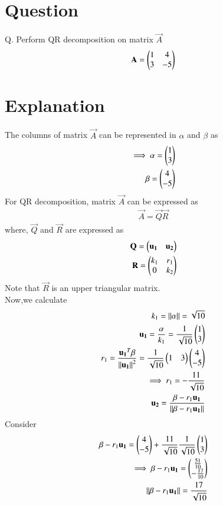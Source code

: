 \documentclass[journal,12pt,twocolumn]{IEEEtran}
\begin{document}
\section{\textbf{Question}}
Q. Perform QR decomposition on matrix $\vec{A}$
\begin{align}
    \mathbf{A}=\begin{pmatrix} 1 & 4 \\ 3 & -5 \end{pmatrix}\label{givmat}
\end{align}
\section{\textbf{Explanation}}
The columns of matrix $\vec{A}$ can be represented in $\alpha$ and $\beta$ as
\begin{align}
    \implies\alpha=\begin{pmatrix}1 \\ 3\end{pmatrix}\\
    \beta=\begin{pmatrix}4 \\ -5\end{pmatrix}
\end{align}
For QR decomposition, matrix $\vec{A}$ can be expressed as
\begin{align}
    \vec{A}=\vec{Q}\vec{R}\label{decomp}
\end{align}
where, $\vec{Q}$ and $\vec{R}$ are expressed as
\begin{align}
    \mathbf{Q}=\begin{pmatrix}\mathbf{u_1} & \mathbf{u_2}\end{pmatrix}\label{Q}\\
    \mathbf{R}=\begin{pmatrix}k_1 & r_1 \\ 0 & k_2\end{pmatrix}\label{R}
\end{align}
Note that $\vec{R}$ is an upper triangular matrix.\\
Now,we calculate
\begin{align}
    k_1=\left\lVert\alpha\right\rVert=\sqrt{10}\\
    \mathbf{u_1}=\frac{\alpha}{k_1}=\frac{1}{\sqrt{10}}\begin{pmatrix}1 \\ 3\end{pmatrix}\\
    r_1=\frac{\mathbf{u_1}^T\beta}{\left\lVert\mathbf{u_1}\right\rVert^2}=\frac{1}{\sqrt{10}}\begin{pmatrix}1 & 3\end{pmatrix}\begin{pmatrix}4 \\ -5\end{pmatrix}\\
    \implies r_1=-\frac{11}{\sqrt{10}}\\
    \mathbf{u_2}=\frac{\beta-r_1\mathbf{u_1}}{\left\lVert\beta-r_1\mathbf{u_1}\right\rVert}\label{u2}
\end{align}
Consider
\begin{align}
    \beta-r_1\mathbf{u_1}=\begin{pmatrix}4 \\ -5\end{pmatrix}+\frac{11}{\sqrt{10}}\frac{1}{\sqrt{10}}\begin{pmatrix}1 \\ 3\end{pmatrix}\\
    \implies\beta-r_1\mathbf{u_1}=\begin{pmatrix}\frac{51}{10}\\-\frac{17}{10}\end{pmatrix}\label{num}\\
    \left\lVert\beta-r_1\mathbf{u_1}\right\rVert=\frac{17}{\sqrt{10}}\label{den}
\end{align}
\end{document}
